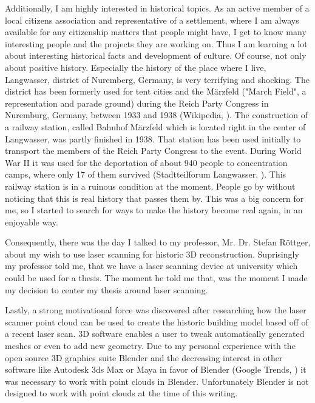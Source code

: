 Additionally, I am highly interested in historical topics. As an active member of a local citizens association and representative of a settlement, where I am always available for any citizenship matters that people might have, I get to know many interesting people and the projects they are working on. Thus I am learning a lot about interesting historical facts and development of culture. Of course, not only about positive history. Especially the history of the place where I live, Langwasser, district of Nuremberg, Germany, is very terrifying and shocking. The district has been formerly used for tent cities and the Märzfeld ("March Field", a representation and parade ground) during the Reich Party Congress in Nuremburg, Germany, between 1933 and 1938 (Wikipedia, \parencite{wiki:NaziPartyRallyGround}). The construction of a railway station, called Bahnhof Märzfeld which is located right in the center of Langwasser, was partly finished in 1938. That station has been used initially to transport the members of the Reich Party Congress to the event. During World War II it was used for the deportation of about 940 people to concentration camps, where only 17 of them survived (Stadtteilforum Langwasser, \parencite{StadtteilforumTafel6}). This railway station is in a ruinous condition at the moment. People go by without noticing that this is real history that passes them by. This was a big concern for me, so I started to search for ways to make the history become real again, in an enjoyable way.

Consequently, there was the day I talked to my professor, Mr. Dr. Stefan Röttger, about my wish to use laser scanning for historic 3D reconstruction. Suprisingly my professor told me, that we have a laser scanning device at university which could be used for a thesis. The moment he told me that, was the moment I made my decision to center my thesis around laser scanning.

Lastly, a strong motivational force was discovered after researching how the laser scanner point cloud can be used to create the historic building model based off of a recent laser scan. 3D software enables a user to tweak automatically generated meshes or even to add new geometry. Due to my personal experience with the open source 3D graphics suite Blender and the decreasing interest in other software like Autodesk 3ds Max or Maya in favor of Blender (Google Trends, \parencite{Interest3DSoftware}) it was necessary to work with point clouds in Blender. Unfortunately Blender is not designed to work with point clouds at the time of this writing.

